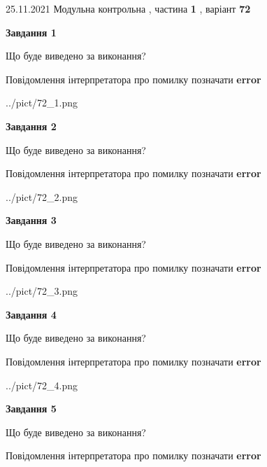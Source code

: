 \documentclass[10pt, ukrainian]{article}
\begin{document}
{25.11.2021 Модульна контрольна , частина \textbf { 1 }, варіант  \No \textbf { 72 }\par}
{
\begin {large}

{\begin {center}\textbf{Завдання 1}\end {center}}\par
Що буде виведено за виконання? \par
Повідомлення інтерпретатора про помилку позначати \textbf{error}

\begin{center}
	{../pict/72_1.png}
\end{center}
\newpage

{\begin {center}\textbf{Завдання 2}\end {center}}\par
Що буде виведено за виконання? \par
Повідомлення інтерпретатора про помилку позначати \textbf{error}

\begin{center}
	{../pict/72_2.png}
\end{center}
\newpage

{\begin {center}\textbf{Завдання 3}\end {center}}\par
Що буде виведено за виконання? \par
Повідомлення інтерпретатора про помилку позначати \textbf{error}

\begin{center}
	{../pict/72_3.png}
\end{center}
\newpage

{\begin {center}\textbf{Завдання 4}\end {center}}\par
Що буде виведено за виконання? \par
Повідомлення інтерпретатора про помилку позначати \textbf{error}

\begin{center}
	{../pict/72_4.png}
\end{center}
\newpage

{\begin {center}\textbf{Завдання 5}\end {center}}\par
Що буде виведено за виконання? \par
Повідомлення інтерпретатора про помилку позначати \textbf{error}


\end{large}}
\end{document}
